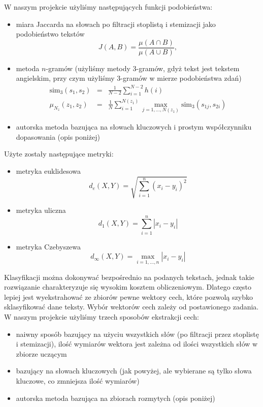 \documentclass[a4paper]{classrep}
\begin{document}
W naszym projekcie użyliśmy następujących funkcji podobieństwa:
\begin{itemize}
\item miara Jaccarda na słowach po filtracji stoplistą i stemizacji jako podobieństwo tekstów
\begin{equation}
J(A,B) = \frac{\mu(A\cap B)}{\mu(A \cup B)},
\end{equation}
\item metoda \(n\)-gramów (użyliśmy metody 3-gramów, gdyż tekst jest tekstem angielskim, przy czym użyliśmy 3-gramów w mierze podobieństwa zdań)
\begin{eqnarray}
\textrm{sim}_3(s_1,s_2) & = & \frac{1}{N-2}\sum_{i=1}^{N-2}h(i) \\
\mu_{N_z}(z_1, z_2) & = & \frac{1}{N} \sum_{i=1}^{N(z_1)}\max_{j=1,\ldots,N(z_1)} \textrm{sim}_3(s_{1j}, s_{2i})
\end{eqnarray}
\item autorska metoda bazująca na słowach kluczowych i prostym współczynniku dopasowania (opis poniżej) 
\end{itemize}
Użyte zostały następujące metryki:
\begin{itemize}
\item metryka euklidesowa
\begin{equation}
d_e(X,Y)=\sqrt{\sum_{i=1}^n(x_i-y_i)^2}
\end{equation}
\item metryka uliczna
\begin{equation}
d_1(X,Y)=\sum_{i=1}^n|x_i-y_i|
\end{equation}
\item metryka Czebyszewa
\begin{equation}
d_\infty(X,Y)=\max_{i=1,\ldots,n}|x_i-y_i|
\end{equation}
\end{itemize}

Klasyfikacji można dokonywać bezpośrednio na podanych tekstach, jednak takie rozwiązanie charakteryzuje się wysokim kosztem obliczeniowym. Dlatego często lepiej jest
wyekstrahować ze zbiorów pewne wektory cech, które pozwolą szybko sklasyfikować dane teksty. Wybór wektorów cech zależy od postawionego zadania.
W naszym projekcie użyliśmy trzech sposobów ekstrakcji cech:
\begin{itemize}
\item naiwny sposób bazujący na użyciu wszystkich słów (po filtracji przez stoplistę i stemizacji), ilość wymiarów wektora jest zależna od ilości wszystkich słów w zbiorze uczącym
\item bazujący na słowach kluczowych (jak powyżej, ale wybierane są tylko słowa kluczowe, co zmniejsza ilość wymiarów)
\item autorska metoda bazująca na zbiorach rozmytych (opis poniżej)
\end{itemize}
\end{document}
